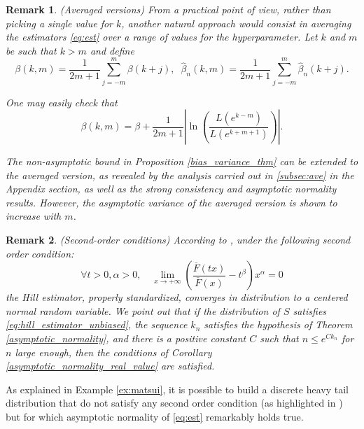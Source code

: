 \documentclass[sn-mathphys-ay]{sn-jnl}%
\newtheorem{remark}{Remark}%
\begin{document}
\begin{remark} {\sc (Averaged versions)}
    From a practical point of view, rather than picking a single value for $k$, another natural approach would consist in averaging the estimators \eqref{eq:est} over a range of values for the hyperparameter. Let \(k\) and \(m\) be such that \(k>m\) and define
    \begin{equation*}
        \beta \left( {k,m} \right)       = \frac{1}{{2m + 1}}\sum\limits_{j =  - m}^m {\beta \left( {k + j} \right)},\;\;
        \widehat \beta_n \left( {k,m} \right)  = \frac{1}{{2m + 1}}\sum\limits_{j =  - m}^m {\widehat \beta_n \left( {k + j} \right)}.
    \end{equation*}

    One may easily check that
    \begin{equation}\label{bias_average_eq}
        \beta \left( {k,m} \right) = \beta  + \frac{1}{{2m + 1}}\left| {\ln \left( {\frac{{L\left( {{e^{k - m}}} \right)}}{{L\left( {{e^{k + m + 1}}} \right)}}} \right)} \right|.
    \end{equation}

    The non-asymptotic bound in Proposition \ref{bias_variance_thm} can be extended to
    the averaged version, as revealed by the analysis carried out in \ref{subsec:ave} in
    the Appendix section, as well as the strong consistency and asymptotic normality
    results. However, the asymptotic variance of the averaged version is shown to
    increase with $m$.
\end{remark}
\begin{remark}{\sc (Second-order conditions)}
    According to \cite[Remark 3.2.6]{de2007extreme}, under the following second order condition:
    \begin{equation}\label{eq:hill_estimator_unbiased}
        \forall t>0, \alpha>0,\quad \lim_{x\to +\infty}\left( {\frac{\overline{F}(tx)}{\overline{F}(x)}}-t^\beta \right)x^{\alpha}=0
    \end{equation}
    the Hill estimator, properly standardized, converges in distribution to a centered normal
    random variable. We point out that if the distribution of \(S\) satisfies
    \eqref{eq:hill_estimator_unbiased}, the sequence \(k_n\) satisfies the hypothesis of
    Theorem \ref{asymptotic_normality}, and there is a positive constant \(C\) such that \(n\leq e^{C k_n}\)
    for \(n\) large enough, then the conditions of Corollary \ref{asymptotic_normality_real_value} are satisfied.
\end{remark}
As explained in Example \ref{ex:matsui}, it is possible to build a discrete heavy tail distribution that do not satisfy any second order condition (as highlighted in \cite{Matsui2013}) but for which asymptotic normality of \eqref{eq:est} remarkably holds true.
\end{document}
